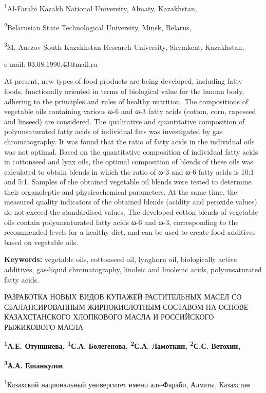 \textsuperscript{1}Al-Farabi Kazakh National University, Almaty,
Kazakhstan,

\textsuperscript{2}Belarusian State Technological University, Minsk,
Belarus,

\textsuperscript{3}M. Auezov South Kazakhstan Research University,
Shymkent, Kazakhstan,

e-mail: 03.08.1990.43@mail.ru

At present, new types of food products are being developed, including
fatty foods, functionally oriented in terms of biological value for the
human body, adhering to the principles and rules of healthy nutrition.
The compositions of vegetable oils containing various ω-6 and ω-3 fatty
acids (cotton, corn, rapeseed and linseed) are considered. The
qualitative and quantitative composition of polyunsaturated fatty acids
of individual fats was investigated by gas chromatography. It was found
that the ratio of fatty acids in the individual oils was not optimal.
Based on the quantitative composition of individual fatty acids in
cottonseed and lynx oils, the optimal composition of blends of these
oils was calculated to obtain blends in which the ratio of ω-3 and ω-6
fatty acids is 10:1 and 5:1. Samples of the obtained vegetable oil
blends were tested to determine their organoleptic and physicochemical
parameters. At the same time, the measured quality indicators of the
obtained blends (acidity and peroxide values) do not exceed the
standardised values. The developed cotton blends of vegetable oils
contain polyunsaturated fatty acids ω-6 and ω-3, corresponding to the
recommended levels for a healthy diet, and can be used to create food
additives based on vegetable oils.

{\bfseries Keywords:} vegetable oils, cottonseed oil, lynghorn oil,
biologically active additives, gas-liquid chromatography, linoleic and
linolenic acids, polyunsaturated fatty acids.

РАЗРАБОТКА НОВЫХ ВИДОВ КУПАЖЕЙ РАСТИТЕЛЬНЫХ МАСЕЛ СО СБАЛАНСИРОВАННЫМ
ЖИРНОКИСЛОТНЫМ СОСТАВОМ НА ОСНОВЕ КАЗАХСТАНСКОГО ХЛОПКОВОГО МАСЛА И
РОССИЙСКОГО РЫЖИКОВОГО МАСЛА

{\bfseries \textsuperscript{1}А.Е. Отуншиева, \textsuperscript{1}С.А.
Болегенова, \textsuperscript{2}С.А. Ламоткин, \textsuperscript{2}С.С.
Ветохин,}

{\bfseries \textsuperscript{3}А.А. Ешанкулов}

\textsuperscript{1}Казахский национальный университет имени аль-Фараби,
Алматы, Казахстан

